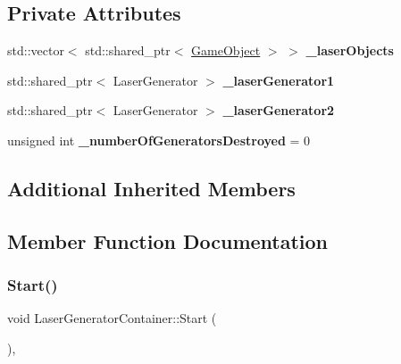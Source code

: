 \subsection*{Private Attributes}
\begin{DoxyCompactItemize}
\item 
\mbox{\label{class_laser_generator_container_adf4406a310a5c67eabace28f364e008c}} 
std\+::vector$<$ std\+::shared\+\_\+ptr$<$ \hyperlink{class_game_object}{Game\+Object} $>$ $>$ {\bfseries \+\_\+laser\+Objects}
\item 
\mbox{\label{class_laser_generator_container_a8c690ffb366df925a29926b7988399d3}} 
std\+::shared\+\_\+ptr$<$ Laser\+Generator $>$ {\bfseries \+\_\+laser\+Generator1}
\item 
\mbox{\label{class_laser_generator_container_abdc918ac8e5ebba549e131145ad6d954}} 
std\+::shared\+\_\+ptr$<$ Laser\+Generator $>$ {\bfseries \+\_\+laser\+Generator2}
\item 
\mbox{\label{class_laser_generator_container_a36689e4d1a876aff7fb27a4fdc07c134}} 
unsigned int {\bfseries \+\_\+number\+Of\+Generators\+Destroyed} = 0
\end{DoxyCompactItemize}
\subsection*{Additional Inherited Members}


\subsection{Member Function Documentation}
\mbox{\label{class_laser_generator_container_a9fc676b255f742a97ec0eb6036491684}} 
\subsubsection{\texorpdfstring{Start()}{Start()}}
{\footnotesize\ttfamily void Laser\+Generator\+Container\+::\+Start (\begin{DoxyParamCaption}{ }\end{DoxyParamCaption})\hspace{0.3cm}{\ttfamily [inline]}, {\ttfamily [virtual]}}



